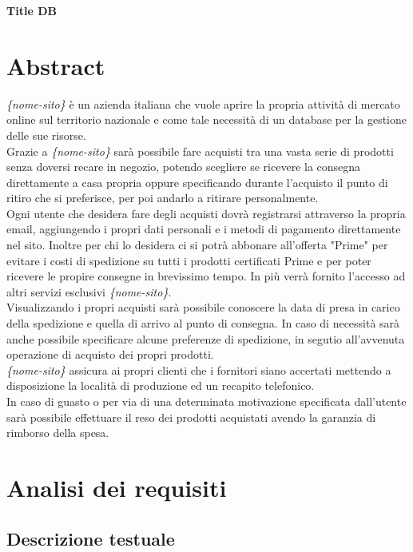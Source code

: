 \documentclass[11pt]{article}
\begin{document}
\begin{center}
    \huge\textbf{Title DB}
\end{center}

\section{Abstract}

\textit{\{nome-sito\}} è un azienda italiana che vuole aprire la propria attività di mercato online
sul territorio nazionale e come tale necessità di un database per la gestione delle sue risorse.\\
Grazie a \textit{\{nome-sito\}} sarà possibile fare acquisti tra una vasta serie di prodotti 
senza doversi recare in negozio, potendo scegliere se ricevere la consegna direttamente a casa
propria oppure specificando durante l'acquisto il punto di ritiro che si preferisce,
per poi andarlo a ritirare personalmente.\\
Ogni utente che desidera fare degli acquisti dovrà registrarsi attraverso la propria email,
aggiungendo i propri dati personali e i metodi di pagamento direttamente nel sito.
Inoltre per chi lo desidera ci si potrà abbonare all'offerta "Prime" per evitare i costi di spedizione
su tutti i prodotti certificati Prime e per poter ricevere le propire consegne in brevissimo tempo.
In più verrà fornito l'accesso ad altri servizi esclusivi \textit{\{nome-sito\}}.\\
Visualizzando i propri acquisti sarà possibile conoscere la data di presa in carico della spedizione
e quella di arrivo al punto di consegna. In caso di necessità sarà anche possibile specificare alcune preferenze
di spedizione, in segutio all'avvenuta operazione di acquisto dei propri prodotti.\\
\textit{\{nome-sito\}} assicura ai propri clienti che i fornitori siano accertati mettendo a disposizione
la località di produzione ed un recapito telefonico.\\
In caso di guasto o per via di una determinata motivazione specificata dall'utente sarà
possibile effettuare il reso dei prodotti acquistati avendo la garanzia di rimborso della spesa. 

\section{Analisi dei requisiti}

\subsection{Descrizione testuale}
\end{document}
